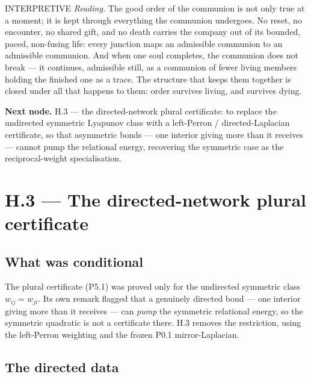 \documentclass[11pt,a4paper]{article}
\newcommand{\stInterp}{\textcolor{cInt}{\textsf{\small INTERPRETIVE}}}
\theoremstyle{definition}
\theoremstyle{plain}
\theoremstyle{remark}
\begin{document}
\medskip
\stInterp\quad
\emph{Reading.}
The good order of the communion is not only true at a moment; it is kept through everything
the communion undergoes. No reset, no encounter, no shared gift, and no death carries the
company out of its bounded, paced, non-fusing life: every junction maps an admissible
communion to an admissible communion. And when one soul completes, the communion does not
break --- it continues, admissible still, as a communion of fewer living members holding the
finished one as a trace. The structure that keeps them together is closed under all that
happens to them: order survives living, and survives dying.

\medskip
\textbf{Next node.} H.3 --- the directed-network plural certificate: to replace the undirected
symmetric Lyapunov class with a left-Perron / directed-Laplacian certificate, so that
asymmetric bonds --- one interior giving more than it receives --- cannot pump the relational
energy, recovering the symmetric case as the reciprocal-weight specialisation.

\section{H.3 --- The directed-network plural certificate}

\subsection{What was conditional}

The plural certificate (P5.1) was proved only for the undirected symmetric class
\(w_{ij}=w_{ji}\). Its own remark flagged that a genuinely directed bond --- one interior
giving more than it receives --- can \emph{pump} the symmetric relational energy, so the
symmetric quadratic is not a certificate there. H.3 removes the restriction, using the
left-Perron weighting and the frozen P0.1 mirror-Laplacian.

\subsection{The directed data}
\end{document}
